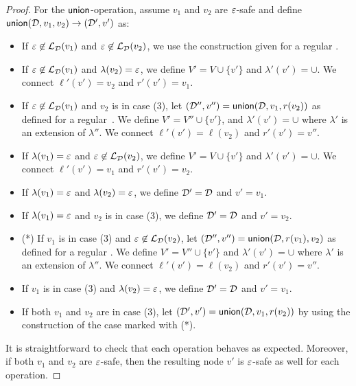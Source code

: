 \begin{proof}
For the $\mathsf{union}$-operation, assume $v_1$ and $v_2$ are $\varepsilon$-safe and
define $\mathsf{union}(\mathcal{D},v_1, v_2) \to (\mathcal{D}',v')$ as:
\begin{itemize}
	\item If $\varepsilon\not\in\mathcal{L}_{\mathcal{D}}(v_1)$ and $\varepsilon\not\in\mathcal{L}_{\mathcal{D}}(v_2)$, we use the construction given for a regular \dsabbr.
	\item If $\varepsilon\not\in\mathcal{L}_{\mathcal{D}}(v_1)$ and $\lambda(v_2) = \varepsilon$, we define $V' = V \cup\{v'\}$ and $\lambda'(v') = \cup$. We connect $\ell'(v') = v_2$ and $r'(v') = v_1$.
	\item If $\varepsilon\not\in\mathcal{L}_{\mathcal{D}}(v_1)$ and $v_2$ is in case (3), let $(\mathcal{D}'',v'') = \mathsf{union}(\mathcal{D},v_1,r(v_2))$ as defined for a regular~\dsabbr. We define $V' = V'' \cup\{v'\}$, and $\lambda'(v') = \cup$ where $\lambda'$ is an extension of $\lambda''$. We connect $\ell'(v') = \ell(v_2)$ and $r'(v') = v''$.
	\item If $\lambda(v_1) = \varepsilon$ and $\varepsilon\not\in\mathcal{L}_{\mathcal{D}}(v_2)$, we define $V' = V \cup\{v'\}$ and $\lambda'(v') = \cup$. We connect $\ell'(v') = v_1$ and $r'(v') = v_2$.
	\item If $\lambda(v_1) = \varepsilon$ and $\lambda(v_2) = \varepsilon$, we define $\mathcal{D}' = \mathcal{D}$ and $v' = v_1$.
	\item If $\lambda(v_1) = \varepsilon$ and $v_2$ is in case (3), we define $\mathcal{D}' = \mathcal{D}$ and $v' = v_2$.
	\item (*) If $v_1$ is in case (3) and $\varepsilon\not\in\mathcal{L}_{\mathcal{D}}(v_2)$, let $(\mathcal{D}'',v'') = \mathsf{union}(\mathcal{D},r(v_1),v_2)$ as defined for a regular \dsabbr.  We define $V' = V'' \cup\{v'\}$ and $\lambda'(v') = \cup$ where $\lambda'$ is an extension of $\lambda''$. We connect $\ell'(v') = \ell(v_2)$ and $r'(v') = v''$. 
	\item If $v_1$ is in case (3) and $\lambda(v_2) = \varepsilon$, we define $\mathcal{D}' = \mathcal{D}$ and $v' = v_1$.
	\item If both $v_1$ and $v_2$ are in case (3), let $(\mathcal{D}',v') = \mathsf{union}(\mathcal{D},v_1,r(v_2))$ by using the construction of the case marked with (*).
\end{itemize}
It is straightforward to check that each operation behaves as expected. 
Moreover, if both $v_1$ and $v_2$ are $\varepsilon$-safe, then the resulting node $v'$ is $\varepsilon$-safe as well for each operation.


\end{proof}
